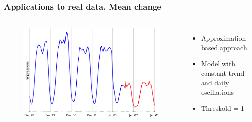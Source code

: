 \documentclass[intlimits, 9pt, unicode]{beamer}
\begin{document}
\begin{frame}
    \frametitle{Applications to real data. Mean change}
  \begin{columns}[T,onlytextwidth]
\begin{figure}
\includegraphics[scale=0.2]{images/methods_comparison_2}
\end{figure}
	    \begin{itemize}
	    \item Approximation-based approach
        \item Model with constant trend and daily oscillations
        \item Threshold = 1
	    \end{itemize}
     \end{columns}
\end{frame}
\end{document}
